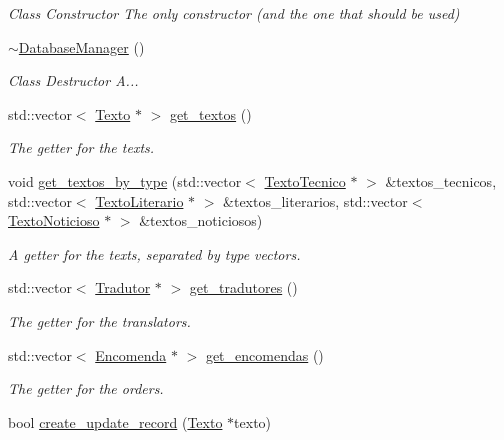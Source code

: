 \begin{DoxyCompactItemize}
\begin{DoxyCompactList}\small\item\em Class Constructor The only constructor (and the one that should be used) \end{DoxyCompactList}\item 
\hyperlink{class_database_manager_ae9b3a5da1e04fbb00faf8a034da1d063}{$\sim$\-Database\-Manager} ()
\begin{DoxyCompactList}\small\item\em Class Destructor A... \end{DoxyCompactList}\item 
std\-::vector$<$ \hyperlink{class_texto}{Texto} $\ast$ $>$ \hyperlink{class_database_manager_a362dc9fb3beb6cd0ca9cb1d42703ec03}{get\-\_\-textos} ()
\begin{DoxyCompactList}\small\item\em The getter for the texts. \end{DoxyCompactList}\item 
void \hyperlink{class_database_manager_a3ea3390feb2069715c7af51ebb41a26c}{get\-\_\-textos\-\_\-by\-\_\-type} (std\-::vector$<$ \hyperlink{class_texto_tecnico}{Texto\-Tecnico} $\ast$ $>$ \&textos\-\_\-tecnicos, std\-::vector$<$ \hyperlink{class_texto_literario}{Texto\-Literario} $\ast$ $>$ \&textos\-\_\-literarios, std\-::vector$<$ \hyperlink{class_texto_noticioso}{Texto\-Noticioso} $\ast$ $>$ \&textos\-\_\-noticiosos)
\begin{DoxyCompactList}\small\item\em A getter for the texts, separated by type vectors. \end{DoxyCompactList}\item 
std\-::vector$<$ \hyperlink{class_tradutor}{Tradutor} $\ast$ $>$ \hyperlink{class_database_manager_ad0f509067821ad15a9b25d86d2b515a4}{get\-\_\-tradutores} ()
\begin{DoxyCompactList}\small\item\em The getter for the translators. \end{DoxyCompactList}\item 
std\-::vector$<$ \hyperlink{class_encomenda}{Encomenda} $\ast$ $>$ \hyperlink{class_database_manager_a5c2b2ad77ee83de5b1fb2f07cdfc6736}{get\-\_\-encomendas} ()
\begin{DoxyCompactList}\small\item\em The getter for the orders. \end{DoxyCompactList}\item 
bool \hyperlink{class_database_manager_a10e0b6e056bcc0b669e272b839ae92fe}{create\-\_\-update\-\_\-record} (\hyperlink{class_texto}{Texto} $\ast$texto)

\end{DoxyCompactItemize}

